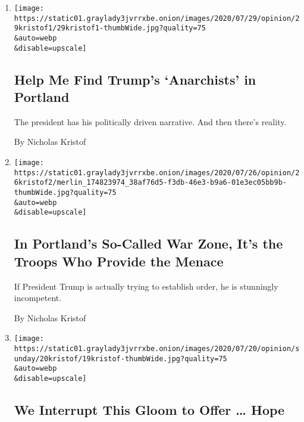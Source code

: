 \begin{enumerate}
\def\labelenumi{\arabic{enumi}.}
\item
  \href{/2020/07/29/opinion/portland-protests-trump.html}{}

  \texttt{[image: https://static01.graylady3jvrrxbe.onion/images/2020/07/29/opinion/29kristof1/29kristof1-thumbWide.jpg?quality=75\\\&auto=webp\\\&disable=upscale]}

  \hypertarget{help-me-find-trumps-anarchists-in-portland}{%
  \subsection{Help Me Find Trump's `Anarchists' in
  Portland}\label{help-me-find-trumps-anarchists-in-portland}}

  The president has his politically driven narrative. And then there's
  reality.

  By Nicholas Kristof
\item
  \href{/2020/07/25/opinion/sunday/portland-protest-federal-troops.html}{}

  \texttt{[image: https://static01.graylady3jvrrxbe.onion/images/2020/07/26/opinion/26kristof2/merlin\_174823974\_38af76d5-f3db-46e3-b9a6-01e3ec05bb9b-thumbWide.jpg?quality=75\\\&auto=webp\\\&disable=upscale]}

  \hypertarget{in-portlands-so-called-war-zone-its-the-troops-who-provide-the-menace}{%
  \subsection{In Portland's So-Called War Zone, It's the Troops Who
  Provide the
  Menace}\label{in-portlands-so-called-war-zone-its-the-troops-who-provide-the-menace}}

  If President Trump is actually trying to establish order, he is
  stunningly incompetent.

  By Nicholas Kristof
\item
  \href{/2020/07/16/opinion/sunday/coronavirus-blm-america-hope.html}{}

  \texttt{[image: https://static01.graylady3jvrrxbe.onion/images/2020/07/20/opinion/sunday/20kristof/19kristof-thumbWide.jpg?quality=75\\\&auto=webp\\\&disable=upscale]}

  \hypertarget{we-interrupt-this-gloom-to-offer--hope}{%
  \subsection{We Interrupt This Gloom to Offer \ldots{}
  Hope}\label{we-interrupt-this-gloom-to-offer--hope}}


\end{enumerate}
